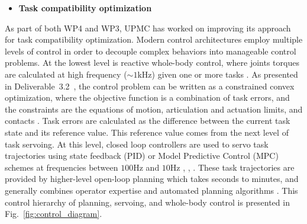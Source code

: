 \begin{itemize}
\item \textbf{Task compatibility optimization}
\end{itemize}
As part of both WP4 and WP3, UPMC has worked on improving its approach for task compatibility optimization. Modern control architectures employ multiple levels of control in order to decouple complex behaviors into manageable control problems. At the lowest level is reactive whole-body control, where joints torques are calculated at high frequency ($\sim1$kHz) given one or more tasks \cite{Khatib2004}. As presented in Deliverable~3.2~\cite{deliverable32}, the control problem can be written as a constrained convex optimization, where the objective function is a combination of task errors, and the constraints are the equations of motion, articulation and actuation limits, and contacts \cite{Salini2011, Saab2013, Bouyarmane2011}. Task errors are calculated as the difference between the current task state and its reference value. This reference value comes from the next level of task servoing. At this level, closed loop controllers are used to servo task trajectories using state feedback (PID) or Model Predictive Control (MPC) schemes at frequencies between $100$Hz and $10$Hz \underline{\bf \cite{Ibanez2014}}, \cite{Koenemann2015}, \underline{\bf \cite{Perrin2015}}. These task trajectories are provided by higher-level open-loop planning which takes seconds to minutes, and generally combines operator expertise and automated planning algorithms \cite{Bouyarmane2012, Pham2014}. This control hierarchy of planning, servoing, and whole-body control is presented in Fig.~\ref{fig:control_diagram}.\\

